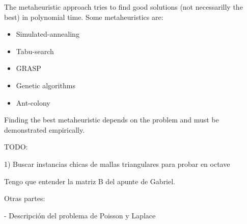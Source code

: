 \documentclass[a4paper,11pt]{article}
\begin{document}
\bigskip

The metaheuristic approach tries to find good solutions (not 
necessarilly the best) in polynomial time. Some metaheuristics are:

\begin{itemize}
	\item Simulated-annealing
	\item Tabu-search
	\item GRASP
	\item Genetic algorithms
	\item Ant-colony
\end{itemize}

Finding the best metaheuristic depends on the problem and must be 
demonstrated empirically.

\newpage


TODO:

1) Buscar instancias chicas de mallas triangulares para probar en 
octave

Tengo que entender la matriz B del apunte de Gabriel.

Otras partes:

- Descripción del problema de Poisson y Laplace
\end{document}
